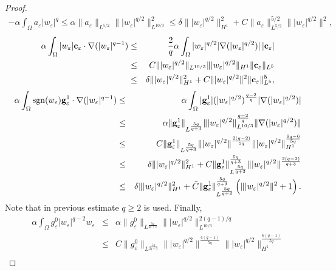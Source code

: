 \documentclass[11pt,reqno]{amsart}%
\numberwithin{equation}{section}
\begin{document}
{\begin{proof}
\begin{eqnarray}
-\alpha\int_\Omega a_{\varepsilon} |w_\varepsilon|^q
\le\alpha\|a_{\varepsilon}\|_{L^{5/2}}\||w_\varepsilon|^{q/2}\|_{L^{10/3}}^2 
\le \delta\||w_\varepsilon|^{q/2}\|^2_{H^1}+C\|a_{\varepsilon}\|_{L^{5/2}}^{5/2}\||w_\varepsilon|^{q/2}\|^2,\label{lem-B-6}
\end{eqnarray}
\begin{eqnarray}
\alpha\int_\Omega |w_\varepsilon| {\bf c}_\varepsilon \cdot \nabla (|w_\varepsilon|^{q-1})
&\le&\frac2q\alpha\int_\Omega |w_\varepsilon|^{q/2} |\nabla(|w_\varepsilon|^{q/2})|\, |{\bf c}_\varepsilon|\nonumber\\
&\le&C\||w_\varepsilon|^{q/2}\|_{L^{10/3}}
\||w_\varepsilon|^{q/2}\|_{H^1}\|{\bf c}_\varepsilon\|_{L^5}\nonumber\\
&\le&\delta\||w_\varepsilon|^{q/2}\|^2_{H^1}+C\||w_\varepsilon|^{q/2}\|^2\|{\bf c}_\varepsilon\|^5_{L^5},\label{lem-B-7}
\end{eqnarray}
\begin{eqnarray}
\alpha\int_\Omega {\rm sgn} (w_\varepsilon) {\bf g}^1_\varepsilon\cdot\nabla(|w_\varepsilon|^{q-1})
&\le&\alpha\int_\Omega |{\bf g}^1_\varepsilon | (|w_\varepsilon|^{q/2})^{\frac{q-2}q} |\nabla(|w_\varepsilon|^{q/2})|
\nonumber\\
&\le&\alpha\|{\bf g}_\varepsilon^1\|_{L^{\frac{5q}{q+3}}}\||w_\varepsilon|^{q/2}\|_{L^{10/3}}^{\frac{q-2}q}\|\nabla(|w_\varepsilon|^{q/2})\|\nonumber\\
&\le&C\|{\bf g}^1_\varepsilon\|_{L^{\frac{5q}{q+3}}}\||w_\varepsilon|^{q/2}\|^{\frac{2(q-2)}{5q}}\||w_\varepsilon|^{q/2}\|_{H^1}^{\frac{8q-6}{5q}}\nonumber\\
&\le&\delta\||w_\varepsilon|^{q/2}\|^2_{H^1}+C\|{\bf g}^1_\varepsilon\|_{L^{\frac{5q}{q+3}}}^{\frac{5q}{q+3}}
\||w_\varepsilon|^{q/2}\|^{\frac{2(q-2)}{q+3}} 
\nonumber \\
&\le&
\delta\||w_\varepsilon|^{q/2}\|^2_{H^1}
+
\tilde{C}
\|{\bf g}^1_\varepsilon\|_{L^{\frac{5q}{q+3}}}^{\frac{5q}{q+3}}
\left(\||w_\varepsilon|^{q/2}\|^2 + 1 \right).\label{lem-B-8}
\end{eqnarray}
Note that in previous estimate $q\ge 2$ is used. Finally,
\begin{eqnarray}
\alpha\int_\Omega g^0_\varepsilon|w_\varepsilon|^{q-2}w_\varepsilon
&\le&\alpha \|g_\varepsilon^0\|_{L^{\frac{5q}{2q+3}}}\||w_\varepsilon|^{q/2}\|_{L^{10/3}}^{2(q-1)/q}\nonumber\\
&\le&C\|g_\varepsilon^0\|_{L^{\frac{5q}{2q+3}}}\||w_\varepsilon|^{q/2}\|^{\frac{4(q-1)}{5q}}\||w_\varepsilon|^{q/2}\|^{\frac{6(q-1)}{5q}}_{H^1}\nonumber\\

\end{eqnarray}
\end{proof}}
\end{document}
